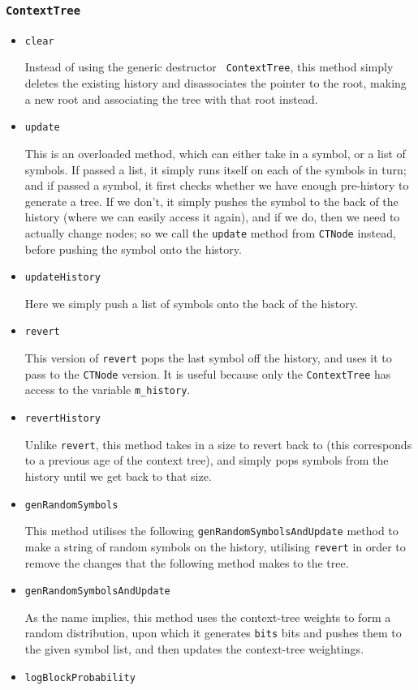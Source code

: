 \documentclass[pdftex,twoside,a4paper]{report}
\begin{document}
\subsubsection{\texttt{ContextTree}}
\begin{itemize}
\item{\texttt{clear}
    
    Instead of using the generic destructor \texttt{~ContextTree}, this method simply deletes the existing history and disassociates the pointer to the root, making a new root and associating the tree with that root instead.
  }
\item{\texttt{update}

    This is an overloaded method, which can either take in a symbol, or a list of symbols. If passed a list, it simply runs itself on each of the symbols in turn; and if passed a symbol, it first checks whether we have enough pre-history to generate a tree. If we don't, it simply pushes the symbol to the back of the history (where we can easily access it again), and if we do, then we need to actually change nodes; so we call the \texttt{update} method from \texttt{CTNode} instead, before pushing the symbol onto the history.
  }
\item{\texttt{updateHistory}
    
    Here we simply push a list of symbols onto the back of the history.
  }
\item{\texttt{revert}
    
    This version of \texttt{revert} pops the last symbol off the history, and uses it to pass to the \texttt{CTNode} version. It is useful because only the \texttt{ContextTree} has access to the variable \texttt{m\_history}.
  }
\item{\texttt{revertHistory}
    
    Unlike \texttt{revert}, this method takes in a size to revert back to (this corresponds to a previous age of the context tree), and simply pops symbols from the history until we get back to that size. 
  }
\item{\texttt{genRandomSymbols}
    
    This method utilises the following \texttt{genRandomSymbolsAndUpdate} method to make a string of random symbols on the history, utilising \texttt{revert} in order to remove the changes that the following method makes to the tree.
  }
\item{\texttt{genRandomSymbolsAndUpdate}
    
    As the name implies, this method uses the context-tree weights to form a random distribution, upon which it generates \texttt{bits} bits and pushes them to the given symbol list, and then updates the context-tree weightings.
  }
\item{\texttt{logBlockProbability}
    
}
\end{itemize}
\end{document}
